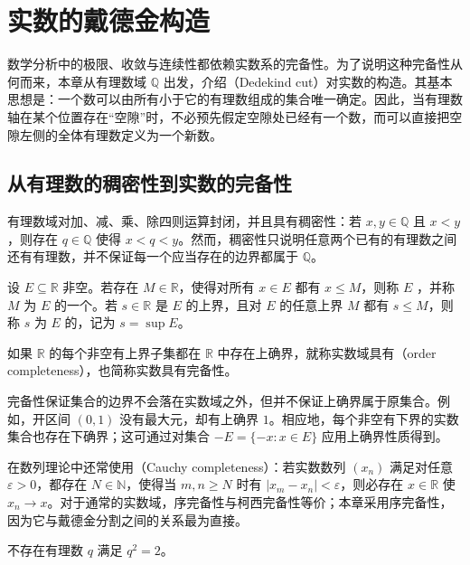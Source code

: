 \documentclass[UTF8,12pt,a4paper,fontset=fandol]{ctexbook}
\begin{document}
\chapter{实数的戴德金构造}

数学分析中的极限、收敛与连续性都依赖实数系的完备性。为了说明这种完备性从何而来，本章从有理数域 $\mathbb{Q}$ 出发，介绍（Dedekind cut）对实数的构造。其基本思想是：一个数可以由所有小于它的有理数组成的集合唯一确定。因此，当有理数轴在某个位置存在“空隙”时，不必预先假定空隙处已经有一个数，而可以直接把空隙左侧的全体有理数定义为一个新数。

\section{从有理数的稠密性到实数的完备性}

有理数域对加、减、乘、除四则运算封闭，并且具有稠密性：若 $x,y\in\mathbb{Q}$ 且 $x<y$，则存在 $q\in\mathbb{Q}$ 使得 $x<q<y$。然而，稠密性只说明任意两个已有的有理数之间还有有理数，并不保证每一个应当存在的边界都属于 $\mathbb{Q}$。

\begin{definition}[实数的序完备性]\label{def:order-completeness}
设 $E\subseteq\mathbb{R}$ 非空。若存在 $M\in\mathbb{R}$，使得对所有 $x\in E$ 都有 $x\le M$，则称 $E$ ，并称 $M$ 为 $E$ 的一个。若 $s\in\mathbb{R}$ 是 $E$ 的上界，且对 $E$ 的任意上界 $M$ 都有 $s\le M$，则称 $s$ 为 $E$ 的，记为 $s=\sup E$。

如果 $\mathbb{R}$ 的每个非空有上界子集都在 $\mathbb{R}$ 中存在上确界，就称实数域具有（order completeness），也简称实数具有完备性。
\end{definition}

完备性保证集合的边界不会落在实数域之外，但并不保证上确界属于原集合。例如，开区间 $(0,1)$ 没有最大元，却有上确界 $1$。相应地，每个非空有下界的实数集合也存在下确界；这可通过对集合 $-E=\{-x:x\in E\}$ 应用上确界性质得到。

在数列理论中还常使用（Cauchy completeness）：若实数数列 $(x_n)$ 满足对任意 $\varepsilon>0$，都存在 $N\in\mathbb{N}$，使得当 $m,n\ge N$ 时有 $|x_m-x_n|<\varepsilon$，则必存在 $x\in\mathbb{R}$ 使 $x_n\to x$。对于通常的实数域，序完备性与柯西完备性等价；本章采用序完备性，因为它与戴德金分割之间的关系最为直接。

\begin{proposition}
不存在有理数 $q$ 满足 $q^2=2$。
\end{proposition}
\end{document}
